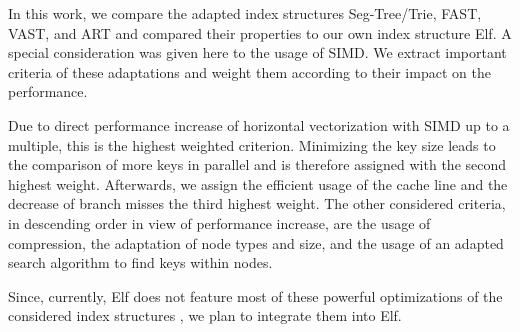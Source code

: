 \documentclass[runningheads,a4paper]{llncs}
\begin{document}

In this work, we compare the adapted index structures Seg-Tree/Trie, FAST, VAST, and ART and compared their properties to our own index structure Elf. A special consideration was given here to the usage of SIMD. We extract important criteria of these adaptations and weight them according to their impact on the performance.

Due to direct performance increase of horizontal vectorization with SIMD up to a multiple, this is the highest weighted criterion. Minimizing the key size leads to the comparison of more keys in parallel and is therefore assigned with the second highest weight. Afterwards, we assign the efficient usage of the cache line and the decrease of branch misses the third highest weight. The other considered criteria, in descending order in view of performance increase, are the usage of compression, the adaptation of node types and size, and the usage of an adapted search algorithm to find keys within nodes. 

%
Since, currently, Elf does not feature most of these powerful optimizations of the considered index structures%
, we plan to integrate them into Elf. %

\end{document}
